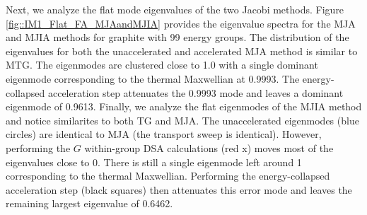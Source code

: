 Next, we analyze the flat mode eigenvalues of the two Jacobi methods. Figure \ref{fig::IM1_Flat_FA_MJAandMJIA} provides the eigenvalue spectra for the MJA and MJIA methods for graphite with 99 energy groups. The distribution of the eigenvalues for both the unaccelerated and accelerated MJA method is similar to MTG. The eigenmodes are clustered close to 1.0 with a single dominant eigenmode corresponding to the thermal Maxwellian at 0.9993. The energy-collapsed acceleration step attenuates the 0.9993 mode and leaves a dominant eigenmode of 0.9613. Finally, we analyze the flat eigenmodes of the MJIA method and notice similarites to both TG and MJA. The unaccelerated eigenmodes (blue circles) are identical to MJA (the transport sweep is identical). However, performing the $G$ within-group DSA calculations (red x) moves most of the eigenvalues close to 0. There is still a single eigenmode left around 1 corresponding to the thermal Maxwellian. Performing the energy-collapsed acceleration step (black squares) then attenuates this error mode and leaves the remaining largest eigenvalue of 0.6462.

